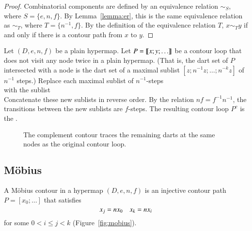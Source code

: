 \begin{proof} 
Combinatorial components are defined by an equivalence relation $\sim_S$, where
$S = \{e,n,f\}$.  By Lemma~\ref{lemma:er}, this is the same equivalence relation as
$\sim_T$, where $T = \{n^{-1},f\}$.  By the definition of the equivalence relation $T$,
$x\sim_T y$ if and only if there is a contour path from $x$ to $y$.
\end{proof}
%

\begin{definition}[complement] 
Let $(D,e,n,f)$ be a plain hypermap.
Let $P={\llbracket{x;y;\ldots}\rrbracket}$ be a contour loop that does not visit any node
twice in a plain hypermap.   (That is, the dart set of $P$ intersected with a node
is the dart set of a maximal sublist $[z;n^{-1}z;\ldots;n^{-k}z]$ of $n^{-1}$ steps.)
 Replace each maximal sublist of
$n^{-1}$-steps
\begin{displaymath}
[z;n^{-1} z; \ldots; n^{-k} z]
\end{displaymath}
with the sublist
\begin{displaymath}
[n^{-(k+1)} z;n^{-(k+2)} z;\ldots; n z]
\end{displaymath}
Concatenate these new sublists in reverse order.  By the relation $n f = f^{-1} n^{-1}$,
the transitions between the new sublists are $f$-steps.
The resulting contour loop $P^c$
is the . 
\end{definition}

\begin{figure}[htb]
\centering
{}
\caption{The complement contour traces the remaining darts
at the same nodes as the original contour loop. }
\label{fig:contour-comp}
\end{figure}


\subsection{M\"obius}

\begin{definition} A M\"obius contour in a hypermap
$(D,e,n,f)$ is an
injective contour path $P=[x_0;\ldots]$ that satisfies
\begin{equation}
\tlabel{eqn:mobius}
x_j = n x_0\quad x_k = n x_i
\end{equation}
for some $0 < i\le j< k$ (Figure~\ref{fig:mobius}).
%
\end{definition}


